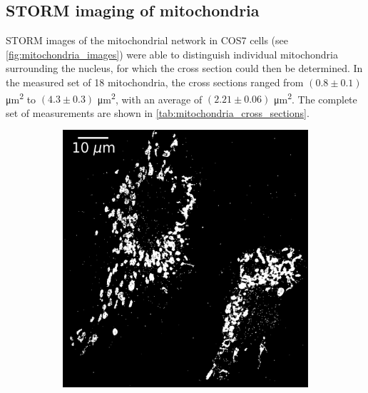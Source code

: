 \subsection{STORM imaging of mitochondria} \label{sec:results_mitochondria}
STORM images of the mitochondrial network in COS7 cells (see \autoref{fig:mitochondria_images}) were able to distinguish individual mitochondria surrounding the nucleus, for which the cross section could then be determined.
In the measured set of 18 mitochondria, the cross sections ranged from $(0.8 \pm 0.1)$ \unit{\micro\meter\squared} to $(4.3 \pm 0.3)$ \unit{\micro\meter\squared}, with an average of $(2.21 \pm 0.06)$ \unit{\micro\meter\squared}. The complete set of measurements are shown in \autoref{tab:mitochondria_cross_sections}.
%
\begin{figure}
    \centering
    \begin{subfigure}{0.49\textwidth}
        \includegraphics[width=\textwidth]{figures/mitochondria_image4.png}
        \caption{}
        \label{fig:mitochondria_image4}
    \end{subfigure}
    \begin{subfigure}{0.49\textwidth}

\end{subfigure}
\end{figure}
